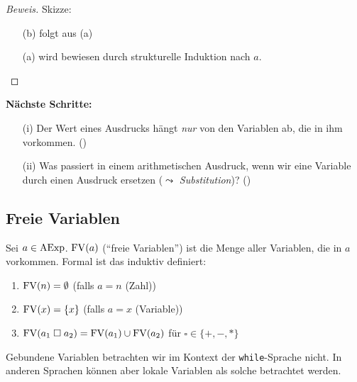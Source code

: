\begin{proof}[Beweis]
    Skizze:
    \begin{enumerate}
        \item[(b)] folgt aus (a)
        \item[(a)] wird bewiesen durch strukturelle Induktion nach $a$.
    \end{enumerate}
\end{proof}

\par\bigskip
\textbf{Nächste Schritte:}
\begin{enumerate}
    \item[(i)] Der Wert eines Ausdrucks hängt \emph{nur} von den Variablen ab, die in ihm vorkommen. ()
    \item[(ii)] Was passiert in einem arithmetischen Ausdruck, wenn wir eine Variable durch einen Ausdruck ersetzen ($\leadsto$ \emph{Substitution})? ()
\end{enumerate}



\subsection{Freie Variablen} \label{section:freeVars}

\begin{definition}
    Sei $a \in \operatorname{AExp}$. $\operatorname{FV}(a)$ (``freie Variablen'') ist die Menge aller Variablen, die in $a$ vorkommen. Formal ist das induktiv definiert:
    \begin{enumerate}
        \item $\operatorname{FV}(n) = \emptyset$ \quad\quad\quad (falls $a = n$ (Zahl))
        \item $\operatorname{FV}(x) = \{ x \}$ \quad\quad (falls $a = x$ (Variable))
        \item $\operatorname{FV}(a_1 \;\square\; a_2) = \operatorname{FV}(a_1) \cup \operatorname{FV}(a_2)$ \quad\quad für $\square \in \{ +, -, * \}$
    \end{enumerate}

    Gebundene Variablen betrachten wir im Kontext der \texttt{while}-Sprache nicht. In anderen Sprachen können aber lokale Variablen \zb{} als solche betrachtet werden.
\end{definition}

